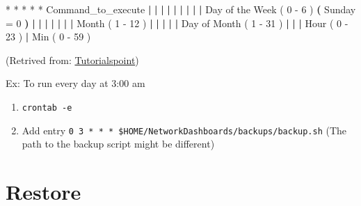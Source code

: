 \documentclass[
]{book}
\newenvironment{Shaded}{\begin{snugshade}}{\end{snugshade}}
\newcommand{\ExtensionTok}[1]{#1}
\newcommand{\KeywordTok}[1]{\textcolor[rgb]{0.13,0.29,0.53}{\textbf{#1}}}
\newcommand{\NormalTok}[1]{#1}
\begin{document}
\begin{enumerate}
\begin{Shaded}
\begin{Highlighting}[]
\ExtensionTok{*}\NormalTok{    *    *   *    *  Command\_to\_execute}
\KeywordTok{|}    \KeywordTok{|}    \KeywordTok{|}    \KeywordTok{|}   \KeywordTok{|}       
\KeywordTok{|}    \KeywordTok{|}    \KeywordTok{|}    \KeywordTok{|}    \ExtensionTok{Day}\NormalTok{ of the Week ( 0 {-} 6 ) }\KeywordTok{(} \ExtensionTok{Sunday}\NormalTok{ = 0 }\KeywordTok{)}
\KeywordTok{|}    \KeywordTok{|}    \KeywordTok{|}    \KeywordTok{|}
\KeywordTok{|}    \KeywordTok{|}    \KeywordTok{|}    \ExtensionTok{Month}\NormalTok{ ( 1 {-} 12 )}
\KeywordTok{|}    \KeywordTok{|}    \KeywordTok{|}
\KeywordTok{|}    \KeywordTok{|}    \ExtensionTok{Day}\NormalTok{ of Month ( 1 {-} 31 )}
\KeywordTok{|}    \KeywordTok{|}
\KeywordTok{|}    \ExtensionTok{Hour}\NormalTok{ ( 0 {-} 23 )}
\KeywordTok{|}
\ExtensionTok{Min}\NormalTok{ ( 0 {-} 59 ) }
\end{Highlighting}
\end{Shaded}

  (Retrived from: \href{https://www.tutorialspoint.com/unix_commands/crontab.htm}{Tutorialspoint})

  Ex: To run every day at 3:00 am

  \begin{enumerate}
  \def\labelenumii{\arabic{enumii}.}
  \item
    \texttt{crontab\ -e}
  \item
    Add entry \texttt{0\ 3\ *\ *\ *\ \$HOME/NetworkDashboards/backups/backup.sh} (The path to the backup script might be different)
  \end{enumerate}
\end{enumerate}

\hypertarget{restore}{%
\section{Restore}\label{restore}}
\end{document}
